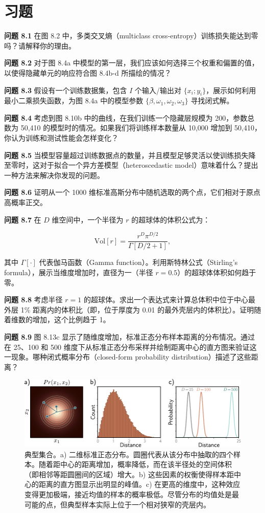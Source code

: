 \documentclass[lang=cn,newtx,10pt,scheme=chinese]{elegantbook}
\begin{document}
\section{习题}
\textbf{问题 8.1} 在图 8.2 中，多类交叉熵（multiclass cross-entropy）训练损失能达到零吗？请解释你的理由。

\textbf{问题 8.2} 对于图 8.4a 中模型的第一层，我们应该如何选择三个权重和偏置的值，以使得隐藏单元的响应符合图 8.4b-d 所描绘的情况？

\textbf{问题 8.3} 假设有一个训练数据集，包含 \( I \) 个输入/输出对 \( \{x_i; y_i\} \)，展示如何利用最小二乘损失函数，为图 8.4a 中的模型参数 \( \{\beta, \omega_1, \omega_2, \omega_3\} \) 寻找闭式解。

\textbf{问题 8.4} 考虑到图 8.10b 中的曲线，在我们训练一个隐藏层规模为 200，参数总数为 50,410 的模型时的情况。如果我们将训练样本数量从 10,000 增加到 50,410，你认为训练和测试性能会怎样变化？

\textbf{问题 8.5} 当模型容量超过训练数据点的数量，并且模型足够灵活以使训练损失降至零时，这对于拟合一个异方差模型（heteroscedastic model）意味着什么？提出一种方法来解决你发现的问题。

\textbf{问题 8.6} 证明从一个 1000 维标准高斯分布中随机选取的两个点，它们相对于原点高概率正交。

\textbf{问题 8.7} 在 \( D \) 维空间中，一个半径为 \( r \) 的超球体的体积公式为：

\begin{equation}
\text{Vol}[r] = \frac{r^D \pi^{D/2}}{\Gamma[D/2 + 1]}, 
\end{equation}

其中 \( \Gamma[\cdot] \) 代表伽马函数（Gamma function）。利用斯特林公式（Stirling's formula），展示当维度增加时，直径为一（半径 \( r=0.5 \)）的超球体体积如何趋于零。

\textbf{问题 8.8} 考虑半径 \( r = 1 \) 的超球体。求出一个表达式来计算总体积中位于中心最外层 1\% 距离内的体积比（即，位于厚度为 0.01 的最外壳层内的体积比）。证明随着维数的增加，这个比例趋于 1。

\textbf{问题 8.9} 图 8.13c 显示了随维度增加，标准正态分布样本距离的分布情况。通过在 25、100 和 500 维度下从标准正态分布采样并绘制距离中心的直方图来验证这一现象。哪种闭式概率分布（closed-form probability distribution）描述了这些距离？

\begin{figure}[ht!]
\centering
\includegraphics[width=0.7\linewidth]{PDFFigures/UDLChap8PDF/PerfTypical.pdf}
\caption{典型集合。a) 二维标准正态分布。圆圈代表从该分布中抽取的四个样本。随着距中心的距离增加，概率降低，而在该半径处的空间体积（即相邻等距圆圈间的区域）增大。b) 这些因素的权衡使得样本距中心的距离的直方图显示出明显的峰值。c) 在更高的维度中，这种效应变得更加极端，接近均值的样本的概率极低。尽管分布的均值处是最可能的点，但典型样本实际上位于一个相对狭窄的壳层内。}
\end{figure}
\end{document}
